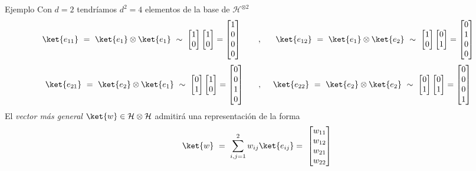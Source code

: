 \documentclass[a4paper,11pt]{book} %
\numberwithin{equation}{chapter}
\begin{document}
	\begin{mybox_green}{Ejemplo}
	Con $d=2$ tendríamos $d^2 = 4$ elementos de la base de $\mathcal{H}^{\otimes 2}$
$$
\ket{e_{11}}~=~ \ket{e_{1}}\otimes \ket{e_{1}}~ \sim~
\begin{bmatrix}1\\ 0\end{bmatrix}\begin{bmatrix}1\\ 0\end{bmatrix} = \begin{bmatrix}1\\0\\0 \\ 0\end{bmatrix}
~~~~~~,~~~~~
\ket{e_{12}}~=~ \ket{e_{1}}\otimes \ket{e_{2}}~\sim~
\begin{bmatrix}1\\ 0\end{bmatrix}\begin{bmatrix}0\\ 1\end{bmatrix} = \begin{bmatrix}0\\1\\0 \\ 0\end{bmatrix}
$$
$$
\ket{e_{21}}~=~ \ket{e_{2}}\otimes \ket{e_{1}}~\sim~
 \begin{bmatrix}0\\ 1\end{bmatrix}\begin{bmatrix}1\\ 0\end{bmatrix} = \begin{bmatrix}0\\0\\1 \\ 0\end{bmatrix}
 ~~~~~,~~~~
\ket{e_{22}}~=~ \ket{e_{2}}\otimes \ket{e_{2}}~\sim~
\begin{bmatrix}0\\ 1\end{bmatrix}\begin{bmatrix}0\\ 1\end{bmatrix} = \begin{bmatrix}0\\0\\0 \\ 1\end{bmatrix}
$$
El \textit{vector más general}  $\ket{w}\in \mathcal{H}\otimes\mathcal{H}$ admitirá una representación de la forma
$$
\ket{w} ~= ~ \sum_{i,j=1}^2 w_{ij} \ket{e_{ij}}=~ \begin{bmatrix}w_{11}\\ w_{12}\\ w_{21} \\ w_{22}  \end{bmatrix}  ~  
$$
	\end{mybox_green}
\end{document}
